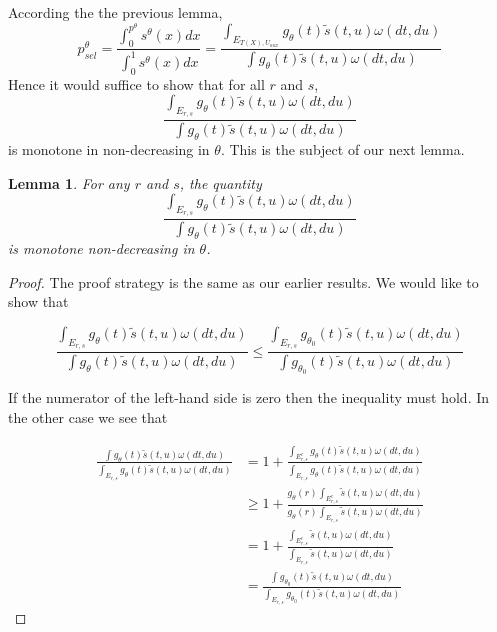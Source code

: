 \documentclass{article}
\newtheorem{lemma}{Lemma}
\begin{document}
\begin{appendix}
According the the previous lemma, 
\begin{equation*}
    p^{\theta}_{sel} = \frac{\int_{0}^{p^{\theta}} s^{\theta}(x) dx}{\int_{0}^{1} s^{\theta}(x) dx} = \frac{\int_{E_{T(X), U_{aux}}} g_{\theta}(t) \tilde{s}(t, u) \omega(dt, du) }{\int g_{\theta}(t) \tilde{s}(t, u) \omega(dt, du) }
\end{equation*}
Hence it would suffice to show that for all $r$ and $s$, 
\begin{equation*}
  \frac{\int_{E_{r, s}} g_{\theta}(t) \tilde{s}(t, u) \omega(dt, du) }{\int g_{\theta}(t) \tilde{s}(t, u) \omega(dt, du) }
\end{equation*}
is monotone in non-decreasing in $\theta$. This is the subject of our next lemma.  

\begin{lemma}
    \label{prop:monotone_adjustment}
    For any $r$ and $s$, the quantity   
    \begin{equation*}
        \frac{\int_{E_{r, s}} g_{\theta}(t) \tilde{s}(t, u) \omega(dt, du) }{\int g_{\theta}(t) \tilde{s}(t, u) \omega(dt, du) }
      \end{equation*}
    is monotone non-decreasing in $\theta$. 
\end{lemma}

\begin{proof}
    The proof strategy is the same as our earlier results. We would like to show that 

    \begin{equation*}
        \frac{\int_{E_{r, s}} g_{\theta}(t) \tilde{s}(t, u) \omega(dt, du) }{\int g_{\theta}(t) \tilde{s}(t, u) \omega(dt, du) } \leq  \frac{\int_{E_{r, s}} g_{\theta_0}(t) \tilde{s}(t, u) \omega(dt, du) }{\int g_{\theta_0}(t) \tilde{s}(t, u) \omega(dt, du) } 
    \end{equation*}

    If the numerator of the left-hand side is zero then the inequality must hold. In the other case we see that 

    \begin{align*}
        \frac{\int g_{\theta}(t) \tilde{s}(t, u) \omega(dt, du)}{\int_{E_{r, s}} g_{\theta}(t) \tilde{s}(t, u) \omega(dt, du) } &= 1 + \frac{\int_{E_{r, s}^c} g_{\theta}(t) \tilde{s}(t, u) \omega(dt, du)}{\int_{E_{r, s}} g_{\theta}(t) \tilde{s}(t, u) \omega(dt, du) } \\
        &\geq 1 + \frac{ g_{\theta}(r) \int_{E_{r, s}^c} \tilde{s}(t, u) \omega(dt, du)}{g_{\theta}(r)\int_{E_{r, s}}  \tilde{s}(t, u) \omega(dt, du) } \\
        &= 1 + \frac{  \int_{E_{r, s}^c} \tilde{s}(t, u) \omega(dt, du)}{\int_{E_{r, s}}  \tilde{s}(t, u) \omega(dt, du) }\\
        &= \frac{\int g_{\theta_0}(t) \tilde{s}(t, u) \omega(dt, du)}{\int_{E_{r, s}} g_{\theta_0}(t) \tilde{s}(t, u) \omega(dt, du) }
    \end{align*}


\end{proof}
\end{appendix}
\end{document}
